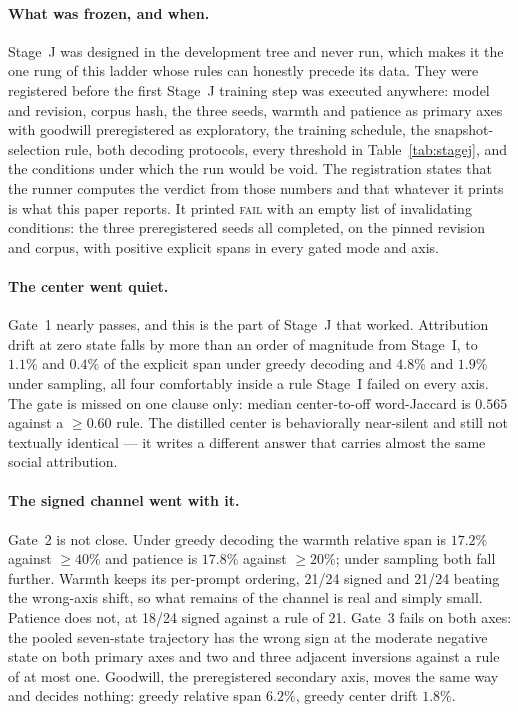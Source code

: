 \documentclass[10pt]{article}
\begin{document}
\paragraph{What was frozen, and when.} Stage~J was designed in the development
tree and never run, which makes it the one rung of this ladder whose rules can
honestly precede its data. They were registered before the first Stage~J
training step was executed anywhere: model and revision, corpus hash, the three
seeds, warmth and patience as primary axes with goodwill preregistered as
exploratory, the training schedule, the snapshot-selection rule, both decoding
protocols, every threshold in Table~\ref{tab:stagej}, and the conditions under
which the run would be void. The registration states that the runner computes
the verdict from those numbers and that whatever it prints is what this paper
reports. It printed \textsc{fail} with an empty list of invalidating conditions:
the three preregistered seeds all completed, on the pinned revision and corpus,
with positive explicit spans in every gated mode and axis.

\paragraph{The center went quiet.} Gate~1 nearly passes, and this is the part of
Stage~J that worked. Attribution drift at zero state falls by more than an order
of magnitude from Stage~I, to $1.1\%$ and $0.4\%$ of the explicit span under
greedy decoding and $4.8\%$ and $1.9\%$ under sampling, all four comfortably
inside a rule Stage~I failed on every axis. The gate is missed on one clause
only: median center-to-off word-Jaccard is $0.565$ against a $\geq 0.60$ rule.
The distilled center is behaviorally near-silent and still not textually
identical --- it writes a different answer that carries almost the same social
attribution.

\paragraph{The signed channel went with it.} Gate~2 is not close.
Under greedy decoding the warmth relative span is $17.2\%$ against $\geq 40\%$
and patience is $17.8\%$ against $\geq 20\%$; under sampling both fall further.
Warmth keeps its per-prompt ordering, 21/24 signed and 21/24 beating the
wrong-axis shift, so what remains of the channel is real and simply small.
Patience does not, at 18/24 signed against a rule of 21. Gate~3 fails on both
axes: the pooled seven-state trajectory has the wrong sign at the moderate
negative state on both primary axes and two and three adjacent inversions
against a rule of at most one. Goodwill, the preregistered secondary axis, moves
the same way and decides nothing: greedy relative span $6.2\%$, greedy center
drift $1.8\%$.
\end{document}
